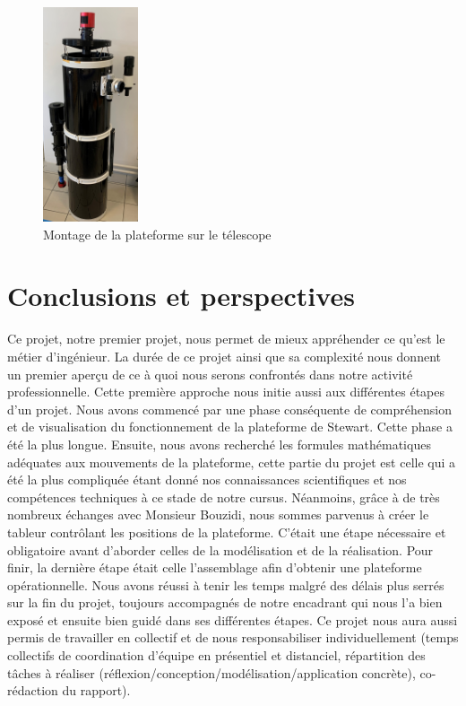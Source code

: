 \documentclass[a4paper,12pt]{article}
\begin{document}
\begin{figure}[H]
  \centering
  \includegraphics[width=0.25\textwidth]{telescope.jpg}
  \caption{Montage de la plateforme sur le télescope}
\end{figure}




\newpage

\section{Conclusions et perspectives}

Ce projet, notre premier projet, nous permet de mieux appréhender
ce qu’est le métier d’ingénieur. La durée de ce projet ainsi que sa complexité nous donnent un premier aperçu de ce à quoi nous serons confrontés dans notre activité professionnelle. Cette
première approche nous initie aussi aux différentes étapes d’un projet. Nous avons
commencé par une phase conséquente de compréhension et de visualisation du fonctionnement de la plateforme de Stewart. Cette phase a été la plus
longue. Ensuite, nous avons recherché les formules mathématiques adéquates aux
mouvements de la plateforme, cette partie du projet est celle qui a été la plus compliquée
étant donné nos connaissances scientifiques et nos compétences techniques à ce stade de notre cursus. Néanmoins, grâce à de très nombreux échanges avec Monsieur Bouzidi, nous sommes parvenus à créer le tableur contrôlant les positions de la plateforme.  C'était une étape nécessaire et obligatoire avant d'aborder celles de la modélisation et de la réalisation.
Pour finir, la dernière étape était celle l’assemblage afin d’obtenir une plateforme opérationnelle.
Nous avons réussi à tenir les temps malgré des délais plus serrés sur la fin du projet,
toujours accompagnés de notre encadrant qui nous l'a bien exposé et ensuite bien guidé dans ses différentes étapes.
Ce projet nous aura aussi permis de travailler en collectif et de nous responsabiliser individuellement (temps collectifs de coordination d'équipe en présentiel et distanciel, répartition des tâches à réaliser (réflexion/conception/modélisation/application concrète), co-rédaction du rapport). 
\end{document}
